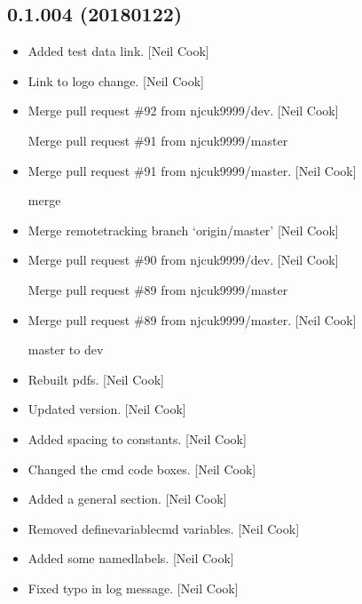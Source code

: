 \documentclass[a4paper,10pt,english]{report}
\begin{document}
\subsection{0.1.004 (2018\sphinxhyphen{}01\sphinxhyphen{}22)}
\label{\detokenize{misc/changelog:id518}}\begin{itemize}
\item {} 
Added test data link. {[}Neil Cook{]}

\item {} 
Link to logo change. {[}Neil Cook{]}

\item {} 
Merge pull request \#92 from njcuk9999/dev. {[}Neil Cook{]}

Merge pull request \#91 from njcuk9999/master

\item {} 
Merge pull request \#91 from njcuk9999/master. {[}Neil Cook{]}

merge

\item {} 
Merge remote\sphinxhyphen{}tracking branch ‘origin/master’ {[}Neil Cook{]}

\item {} 
Merge pull request \#90 from njcuk9999/dev. {[}Neil Cook{]}

Merge pull request \#89 from njcuk9999/master

\item {} 
Merge pull request \#89 from njcuk9999/master. {[}Neil Cook{]}

master to dev

\item {} 
Rebuilt pdfs. {[}Neil Cook{]}

\item {} 
Updated version. {[}Neil Cook{]}

\item {} 
Added spacing to constants. {[}Neil Cook{]}

\item {} 
Changed the cmd code boxes. {[}Neil Cook{]}

\item {} 
Added a general section. {[}Neil Cook{]}

\item {} 
Removed definevariablecmd variables. {[}Neil Cook{]}

\item {} 
Added some namedlabels. {[}Neil Cook{]}

\item {} 
Fixed typo in log message. {[}Neil Cook{]}


\end{itemize}
\end{document}
